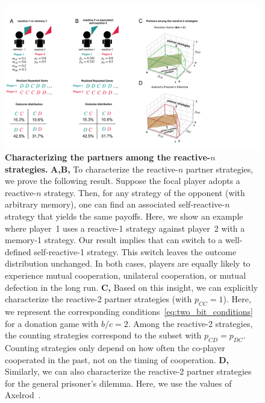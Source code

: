 \documentclass[11pt]{article}
\begin{document}
\begin{figure}[t]
  \centering
  \includegraphics[width=\textwidth]{figures/conceptual_figure_results.pdf}
  \caption{
  \textbf{Characterizing the partners among the reactive-$n$ strategies.} 
{\bf A,B,} To characterize the reactive-$n$ partner strategies, we prove the following result. 
Suppose the focal player adopts a reactive-$n$ strategy. 
Then, for any strategy of the opponent (with arbitrary memory), one can find an associated self-reactive-$n$ strategy that yields the same payoffs. 
Here, we show an example where player~1 uses a reactive-1 strategy against player~2 with a memory-1 strategy. 
Our result implies that can switch to a well-defined self-reactive-1 strategy. 
This switch leaves the outcome distribution unchanged.
In both cases, players are equally likely to experience mutual cooperation, unilateral cooperation, or mutual defection in the long run. 
\textbf{C,} Based on this insight, we can explicitly characterize the reactive-2 partner strategies (with $p_{CC}\!=\!1$). 
Here, we represent the corresponding conditions~\eqref{eq:two_bit_conditions} for a donation game with $b/c\!=\!2$. 
Among the reactive-2 strategies, the counting strategies correspond to the subset with $p_{CD}\!=\!p_{DC}$. 
Counting strategies only depend on how often the co-player cooperated in the past, not on the timing of cooperation.
\textbf{D,} Similarly, we can also characterize the reactive-2 partner strategies for the general prisoner's dilemma. 
Here, we use the values of Axelrod~\citep{axelrod:AAAS:1981}.
}\label{fig:conceptual_figure_results}
\end{figure}
\end{document}
